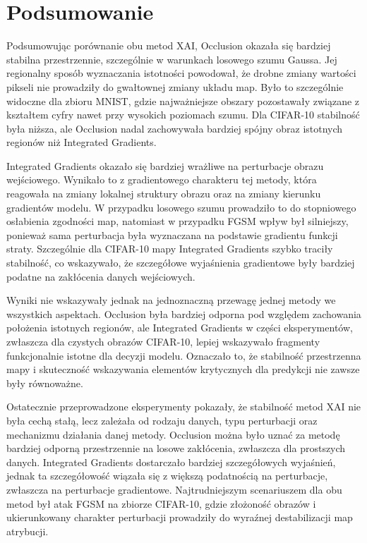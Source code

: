 \chapter{Podsumowanie}

Podsumowując porównanie obu metod XAI, Occlusion okazała się bardziej stabilna przestrzennie, szczególnie w warunkach losowego szumu Gaussa. Jej regionalny sposób wyznaczania istotności powodował, że drobne zmiany wartości pikseli nie prowadziły do gwałtownej zmiany układu map. Było to szczególnie widoczne dla zbioru MNIST, gdzie najważniejsze obszary pozostawały związane z kształtem cyfry nawet przy wysokich poziomach szumu. Dla CIFAR-10 stabilność była niższa, ale Occlusion nadal zachowywała bardziej spójny obraz istotnych regionów niż Integrated Gradients.

Integrated Gradients okazało się bardziej wrażliwe na perturbacje obrazu wejściowego. Wynikało to z gradientowego charakteru tej metody, która reagowała na zmiany lokalnej struktury obrazu oraz na zmiany kierunku gradientów modelu. W przypadku losowego szumu prowadziło to do stopniowego osłabienia zgodności map, natomiast w przypadku FGSM wpływ był silniejszy, ponieważ sama perturbacja była wyznaczana na podstawie gradientu funkcji straty. Szczególnie dla CIFAR-10 mapy Integrated Gradients szybko traciły stabilność, co wskazywało, że szczegółowe wyjaśnienia gradientowe były bardziej podatne na zakłócenia danych wejściowych.

Wyniki nie wskazywały jednak na jednoznaczną przewagę jednej metody we wszystkich aspektach. Occlusion była bardziej odporna pod względem zachowania położenia istotnych regionów, ale Integrated Gradients w części eksperymentów, zwłaszcza dla czystych obrazów CIFAR-10, lepiej wskazywało fragmenty funkcjonalnie istotne dla decyzji modelu. Oznaczało to, że stabilność przestrzenna mapy i skuteczność wskazywania elementów krytycznych dla predykcji nie zawsze były równoważne.

Ostatecznie przeprowadzone eksperymenty pokazały, że stabilność metod XAI nie była cechą stałą, lecz zależała od rodzaju danych, typu perturbacji oraz mechanizmu działania danej metody. Occlusion można było uznać za metodę bardziej odporną przestrzennie na losowe zakłócenia, zwłaszcza dla prostszych danych. Integrated Gradients dostarczało bardziej szczegółowych wyjaśnień, jednak ta szczegółowość wiązała się z większą podatnością na perturbacje, zwłaszcza na perturbacje gradientowe. Najtrudniejszym scenariuszem dla obu metod był atak FGSM na zbiorze CIFAR-10, gdzie złożoność obrazów i ukierunkowany charakter perturbacji prowadziły do wyraźnej destabilizacji map atrybucji.